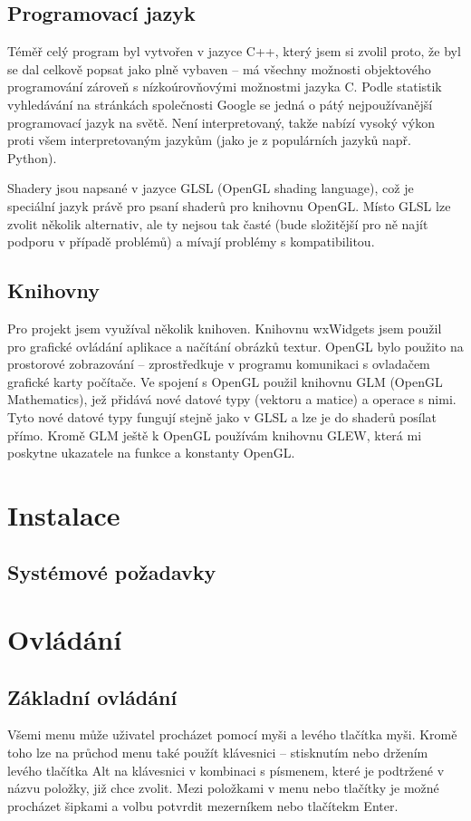 \documentclass[a4paper, 12pt]{report}
\begin{document}
\section{Programovací jazyk}
Téměř celý program byl vytvořen v jazyce C++, který jsem si zvolil proto, že byl se dal celkově popsat jako plně vybaven -- má všechny možnosti objektového programování zároveň s nízkoúrovňovými možnostmi jazyka C. Podle statistik vyhledávání na stránkách společnosti Google se jedná o pátý nejpoužívanější programovací jazyk na světě\cite{github:pypl}. Není interpretovaný, takže nabízí vysoký výkon proti všem interpretovaným jazykům (jako je z populárních jazyků např. Python).

Shadery jsou napsané v jazyce GLSL (OpenGL shading language), což je speciální jazyk právě pro psaní shaderů pro knihovnu OpenGL. Místo GLSL lze zvolit několik alternativ, ale ty nejsou tak časté (bude složitější pro ně najít podporu v případě problémů) a mívají problémy s kompatibilitou.

\section{Knihovny}
Pro projekt jsem využíval několik knihoven. Knihovnu wxWidgets jsem použil pro grafické ovládání aplikace a načítání obrázků textur. OpenGL bylo použito na prostorové zobrazování -- zprostředkuje v programu komunikaci s ovladačem grafické karty počítače. Ve spojení s OpenGL použil knihovnu GLM (OpenGL Mathematics), jež přidává nové datové typy (vektoru a matice) a operace s nimi. Tyto nové datové typy fungují stejně jako v GLSL a lze je do shaderů posílat přímo. Kromě GLM ještě k OpenGL používám knihovnu GLEW, která mi poskytne ukazatele na funkce a konstanty OpenGL.

\chapter{Instalace}
\section{Systémové požadavky}

\chapter{Ovládání}
\section{Základní ovládání}
Všemi menu může uživatel procházet pomocí myši a levého tlačítka myši. Kromě toho lze na průchod menu také použít klávesnici -- stisknutím nebo držením levého tlačítka Alt na klávesnici v kombinaci s písmenem, které je podtržené v názvu položky, již chce zvolit. Mezi položkami v menu nebo tlačítky je možné procházet šipkami a volbu potvrdit mezerníkem nebo tlačítekm Enter.
\end{document}
